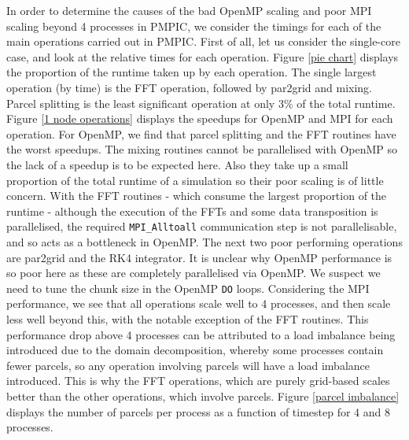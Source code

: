 \documentclass{article}
\begin{document}
In order to determine the causes of the bad OpenMP scaling and poor MPI scaling beyond 4 processes in PMPIC, we consider the timings for each of the main operations carried out in PMPIC. First of all, let us consider the single-core case, and look at the relative times for each operation. Figure \ref{pie chart} displays the proportion of the runtime taken up by each operation. The single largest operation (by time) is the FFT operation, followed by par2grid and mixing. Parcel splitting is the least significant operation at only 3\% of the total runtime. Figure \ref{1 node operations} displays the speedups for OpenMP and MPI for each operation. For OpenMP, we find that parcel splitting and the FFT routines have the worst speedups. The mixing routines cannot be parallelised with OpenMP so the lack of a speedup is to be expected here. Also they take up a small proportion of the total runtime of a simulation so their poor scaling is of little concern. With the FFT routines - which consume the largest proportion of the runtime - although the execution of the FFTs and some data transposition is parallelised, the required \verb|MPI_Alltoall| communication step is not parallelisable, and so acts as a bottleneck in OpenMP. The next two poor performing operations are par2grid and the RK4 integrator. It is unclear why OpenMP performance is so poor here as these are completely parallelised via OpenMP. We suspect we need to tune the chunk size in the OpenMP \verb|DO| loops. Considering the MPI performance, we see that all operations scale well to 4 processes, and then scale less well beyond this, with the notable exception of the FFT routines. This performance drop above 4 processes can be attributed to a load imbalance being introduced due to the domain decomposition, whereby some processes contain fewer parcels, so any operation involving parcels will have a load imbalance introduced. This is why the FFT operations, which are purely grid-based scales better than the other operations, which involve parcels. Figure \ref{parcel imbalance} displays the number of parcels per process as a function of timestep for 4 and 8 processes.
\end{document}
